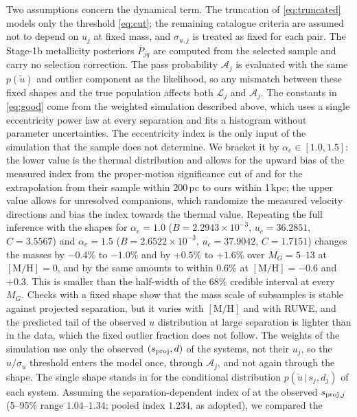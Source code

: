 Two assumptions concern the dynamical term.  The truncation of
\cref{eq:truncated} models only the threshold \cref{eq:cut}; the remaining
catalogue criteria are assumed not to depend on $u_j$ at fixed mass, and
$\sigma_{u,j}$ is treated as fixed for each pair.  The Stage-1b metallicity
posteriors $\overline P_{jq}$ are computed from the selected sample and carry no
selection correction.  The pass probability $\mathcal A_j$ is evaluated with
the same $p(\widetilde u)$ and outlier component as the likelihood, so any
mismatch between these fixed shapes and the true population affects both
$\mathcal L_j$ and $\mathcal A_j$.  The constants in \cref{eq:good} come from the weighted simulation
described above, which uses a single eccentricity power law at every
separation and fits a histogram without parameter uncertainties.  The
eccentricity index is the only input of the simulation that the sample does
not determine.  We bracket it by $\alpha_e\in[1.0,1.5]$: the lower value is
the thermal distribution and allows for the upward bias of the measured index
from the proper-motion significance cut of \citet{Hwang2022Eccentricity} and
for the extrapolation from their sample within 200\,pc to ours within 1\,kpc;
the upper value allows for unresolved companions, which randomize the measured
velocity directions and bias the index towards the thermal value.  Repeating
the full inference with the shapes for $\alpha_e=1.0$
($B=2.2943\times10^{-3}$, $u_c=36.2851$, $C=3.5567$) and $\alpha_e=1.5$
($B=2.6522\times10^{-3}$, $u_c=37.9042$, $C=1.7151$) changes the masses by
$-0.4\%$ to $-1.0\%$ and by $+0.5\%$ to $+1.6\%$ over $M_G=5$--$13$ at
$[\mathrm{M/H}]=0$, and by the same amounts to within $0.6\%$ at
$[\mathrm{M/H}]=-0.6$ and $+0.3$.  This is smaller than the half-width of the
68\% credible interval at every $M_G$.  Checks with a fixed shape show that the
mass scale of subsamples is stable against projected separation, but it varies
with $[\mathrm{M/H}]$ and with RUWE, and the predicted tail of the observed
$u$ distribution at large separation is lighter than in the data, which the
fixed outlier fraction does not follow.
The weights of the simulation use only the observed $(s_{\rm proj},d)$ of the
systems, not their $u_j$, so the $u/\sigma_u$ threshold enters the model once,
through $\mathcal A_j$, and not again through the shape.  The single
shape stands in for the conditional distribution $p(\widetilde u\,|\,s_j,d_j)$ of
each system.  Assuming the separation-dependent index of
\citet{Hwang2022Eccentricity} at the observed $s_{{\rm proj},j}$ (5--95\%
range $1.04$--$1.34$; pooled index $1.234$, as adopted), we compared the
